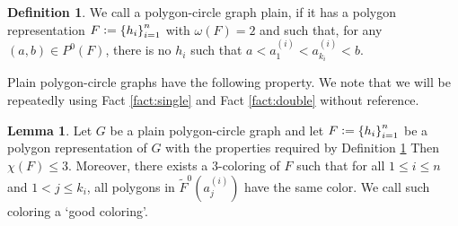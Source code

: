 \documentclass[12pt]{article}
\theoremstyle{definition}
\newtheorem{lemma}[thm]{Lemma}
\newtheorem{defn}[thm]{Definition}
\newcommand{\defeq}{\vcentcolon=}
\begin{document}
     \begin{defn} \label{def:plain}
         We call a polygon-circle graph plain,
         if it has a
         polygon representation
         $F \defeq \left\{h_{i}\right\}_{i = 1}^{n}$ 
         with $\omega\left(F\right) = 2$
         and such that, 
         for any 
         $\left(a, b\right) \in 
         P^{0}\left(F\right)$,
         there is no $h_{i}$ 
         such that
         $a < a_1^{\left(i\right)} < 
         a_{k_{i}}^{\left(i\right)} <
         b$.
     \end{defn}

     Plain polygon-circle graphs have the
     following property. 
     We note that we will
     be repeatedly using
     Fact \ref{fact:single}
     and Fact \ref{fact:double}
     without reference.

     \begin{lemma} \label{lemma:poly}
         Let $G$ be a plain polygon-circle graph and
         let $F \defeq \left\{h_{i}\right\}_{i =1}^{n}$ 
         be a polygon representation of $G$ with
         the properties
         required by Definition
         \ref{def:plain}
         Then $\chi\left(F\right) \leq 3$.
         Moreover, there exists
         a 3-coloring of $F$ such
         that for all $1 \leq i \leq n$
         and $1 < j \leq k_{i}$,
         all polygons in
         $\widetilde{F}^{0}\left(a_{j}^{\left(i\right)}\right)$
         have the same color.
         We call such coloring a
         `good coloring'.
     \end{lemma}
\end{document}
